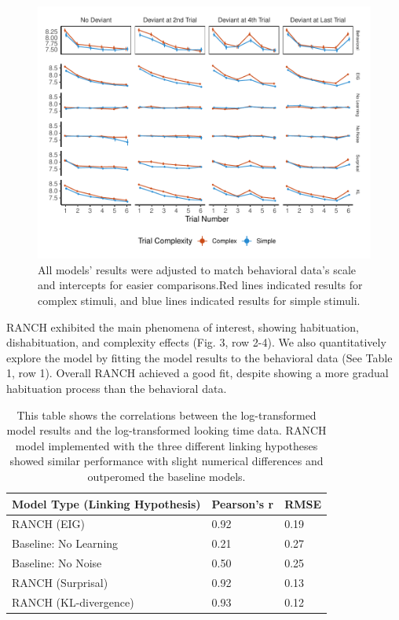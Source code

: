 \documentclass[10pt, letterpaper]{article}
\newenvironment{CodeChunk}{}{}
\begin{document}
\begin{CodeChunk}
\begin{figure}[t!]

{\centering \includegraphics{figs/experiment_res-1} 

}

\caption[All models’ results were adjusted to match behavioral data’s scale and intercepts for easier comparisons.Red lines indicated results for complex stimuli, and blue lines indicated results for simple stimuli]{All models’ results were adjusted to match behavioral data’s scale and intercepts for easier comparisons.Red lines indicated results for complex stimuli, and blue lines indicated results for simple stimuli.}\label{fig:experiment_res}
\end{figure}
\end{CodeChunk}

RANCH exhibited the main phenomena of interest, showing habituation,
dishabituation, and complexity effects (Fig. 3, row 2-4). We also
quantitatively explore the model by fitting the model results to the
behavioral data (See Table 1, row 1). Overall RANCH achieved a good fit,
despite showing a more gradual habituation process than the behavioral
data.

\begin{table}[ht]
\centering
\begin{tabular}{lll}
  \hline
Model Type (Linking Hypothesis) & Pearson's r & RMSE \\ 
  \hline
RANCH (EIG) & 0.92 & 0.19 \\ 
  Baseline: No Learning & 0.21 & 0.27 \\ 
  Baseline: No Noise & 0.50 & 0.25 \\ 
  RANCH (Surprisal) & 0.92 & 0.13 \\ 
  RANCH (KL-divergence) & 0.93 & 0.12 \\ 
   \hline
\end{tabular}
\caption{This table shows the correlations between the log-transformed model results and the log-transformed looking time data. RANCH model implemented with the three different linking hypotheses showed similar performance with slight numerical differences and outperomed the baseline models.} 
\end{table}
\end{document}

